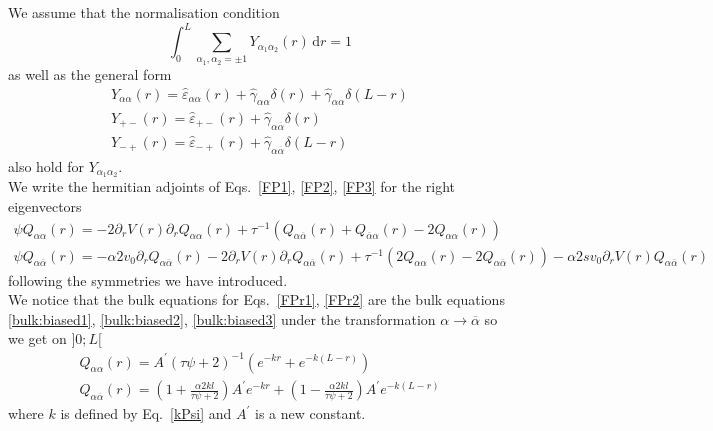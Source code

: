 \documentclass[pre,aps,superscriptaddress,nofootinbib]{revtex4}
\begin{document}
We assume that the normalisation condition
\begin{equation}
\int_0^L \sum_{\alpha_1, \alpha_2 = \pm 1} Y_{\alpha_1\alpha_2}(r) \, \mathrm{d}r = 1
\label{normalisation_pave}
\end{equation}
as well as the general form
\begin{eqnarray}
Y_{\alpha\alpha}(r) = \hat{\varepsilon}_{\alpha\alpha}(r) + \hat{\gamma}_{\alpha\alpha} \delta (r) +  \hat{\gamma}_{\alpha\alpha} \delta (L - r)\\
Y_{+-}(r) = \hat{\varepsilon}_{+-}(r) + \hat{\gamma}_{\alpha\overline{\alpha}} \delta (r)\\
Y_{-+}(r) = \hat{\varepsilon}_{-+}(r) + \hat{\gamma}_{\alpha\overline{\alpha}} \delta (L - r)
\end{eqnarray}
also hold for $Y_{\alpha_1\alpha_2}$.\\

We write the hermitian adjoints of Eqs.~\ref{FP1}, \ref{FP2}, \ref{FP3} for the right eigenvectors
\begin{eqnarray}
\label{FPr1}
\psi Q_{\alpha\alpha}(r) = -2 \partial_r V(r) \partial_r Q_{\alpha\alpha}(r) + \tau^{-1} (Q_{\alpha\overline{\alpha}}(r) + Q_{\overline{\alpha}\alpha}(r) - 2 Q_{\alpha\alpha}(r))\\
\label{FPr2}
\psi Q_{\alpha\overline{\alpha}}(r) = - \alpha 2 v_0 \partial_r Q_{\alpha\overline{\alpha}}(r) - 2 \partial_r V(r) \partial_r Q_{\alpha\overline{\alpha}}(r) + \tau^{-1} (2 Q_{\alpha\alpha}(r) - 2 Q_{\alpha\overline{\alpha}}(r)) - \alpha 2 s v_0 \partial_r V(r) Q_{\alpha\overline{\alpha}}(r)
\end{eqnarray}
following the symmetries we have introduced.\\

We notice that the bulk equations for Eqs.~\ref{FPr1}, \ref{FPr2} are the bulk equations \eqref{bulk:biased1}, \eqref{bulk:biased2}, \eqref{bulk:biased3} under the transformation $\alpha \to \overline{\alpha}$ so we get on $]0;L[$
\begin{eqnarray}
\label{qaa}
Q_{\alpha\alpha}(r) = A^{\prime} (\tau \psi + 2)^{-1} (e^{-k r} + e^{-k (L - r)})\\
\label{qaoa}
Q_{\alpha\overline{\alpha}}(r) = \left(1 + \frac{\alpha 2 k l}{\tau \psi + 2}\right) A^{\prime} e^{- k r} + \left(1 - \frac{\alpha 2 k l}{\tau \psi + 2}\right) A^{\prime} e^{- k (L - r)}
\end{eqnarray}
where $k$ is defined by Eq.~\ref{kPsi} and $A^{\prime}$ is a new constant.\\
\end{document}
